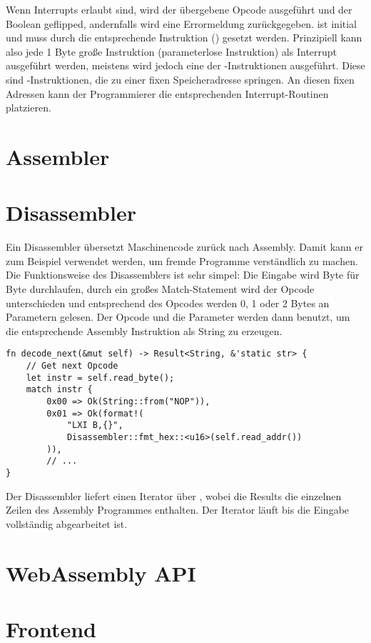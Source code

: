 Wenn Interrupts erlaubt sind, wird der übergebene Opcode ausgeführt und der Boolean geflipped, andernfalls wird eine Errormeldung zurückgegeben.  ist initial  und muss durch die entsprechende Instruktion () gesetzt werden.
Prinzipiell kann also jede 1 Byte große Instruktion (parameterlose Instruktion) als Interrupt ausgeführt werden, meistens wird jedoch eine der -Instruktionen ausgeführt. Diese sind -Instruktionen, die zu einer fixen Speicheradresse springen. An diesen fixen Adressen kann der Programmierer die entsprechenden Interrupt-Routinen platzieren.

\section{Assembler}

\section{Disassembler}

Ein Disassembler übersetzt Maschinencode zurück nach Assembly. Damit kann er zum Beispiel verwendet werden, um fremde Programme verständlich zu machen.
Die Funktionsweise des Disassemblers ist sehr simpel: Die Eingabe wird Byte für Byte durchlaufen, durch ein großes Match-Statement wird der Opcode unterschieden und entsprechend des Opcodes werden 0, 1 oder 2 Bytes an Parametern gelesen. Der Opcode und die Parameter werden dann benutzt, um die entsprechende Assembly Instruktion als String zu erzeugen.

\begin{verbatim}
fn decode_next(&mut self) -> Result<String, &'static str> {
    // Get next Opcode
    let instr = self.read_byte();
    match instr {
        0x00 => Ok(String::from("NOP")),
        0x01 => Ok(format!(
            "LXI B,{}",
            Disassembler::fmt_hex::<u16>(self.read_addr())
        )),
        // ...
}
\end{verbatim}

Der Disassembler liefert einen Iterator über , wobei die Results die einzelnen Zeilen des Assembly Programmes enthalten. Der Iterator läuft bis die Eingabe vollständig abgearbeitet ist.

\section{WebAssembly API}

\section{Frontend}

